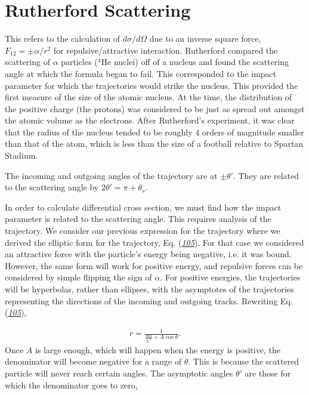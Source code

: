 \documentclass[letterpaper,10pt,english]{sphinxmanual}
\begin{document}
\section{Rutherford Scattering}
\label{\detokenize{chapter1:rutherford-scattering}}
This refers to the calculation of \(d\sigma/d\Omega\) due to an inverse
square force, \(F_{12}=\pm\alpha/r^2\) for repulsive/attractive
interaction. Rutherford compared the scattering of \(\alpha\) particles
(\(^4\)He nuclei) off of a nucleus and found the scattering angle at
which the formula began to fail. This corresponded to the impact
parameter for which the trajectories would strike the nucleus. This
provided the first measure of the size of the atomic nucleus. At the
time, the distribution of the positive charge (the protons) was
considered to be just as spread out amongst the atomic volume as the
electrons. After Rutherford’s experiment, it was clear that the radius
of the nucleus tended to be roughly 4 orders of magnitude smaller than
that of the atom, which is less than the size of a football relative
to Spartan Stadium.

The incoming and outgoing angles of the trajectory are at
\(\pm\theta'\). They are related to the scattering angle by
\(2\theta'=\pi+\theta_s\).

In order to calculate differential cross section, we must find how the
impact parameter is related to the scattering angle. This requires
analysis of the trajectory. We consider our previous expression for
the trajectory where we derived the elliptic form for the trajectory,
Eq. ({\hyperref[\detokenize{chapter1:eq:Ctrajectory}]{\emph{105}}}). For that case we considered an attractive
force with the particle’s energy being negative, i.e. it was
bound. However, the same form will work for positive energy, and
repulsive forces can be considered by simple flipping the sign of
\(\alpha\). For positive energies, the trajectories will be hyperbolas,
rather than ellipses, with the asymptotes of the trajectories
representing the directions of the incoming and outgoing
tracks. Rewriting Eq. ({\hyperref[\detokenize{chapter1:eq:Ctrajectory}]{\emph{105}}}),




\begin{equation*}
\begin{split}
\begin{equation}\label{eq:ruthtraj} \tag{111}
r=\frac{1}{\frac{m\alpha}{L^2}+A\cos\theta}.
\end{equation}
\end{split}
\end{equation*}
Once \(A\) is large enough, which will happen when the energy is
positive, the denominator will become negative for a range of
\(\theta\). This is because the scattered particle will never reach
certain angles. The asymptotic angles \(\theta'\) are those for which
the denominator goes to zero,
\end{document}
